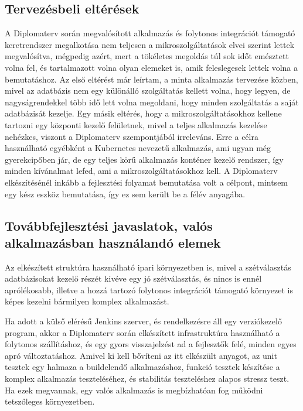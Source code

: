 \documentclass[11pt,magyar,a4paper,twoside,]{report}
\begin{document}
\subsection{Tervezésbeli
eltérések}\label{tervezuxe9sbeli-eltuxe9ruxe9sek}

A Diplomaterv során megvalósított alkalmazás és folytonos integrációt
támogató keretrendszer megalkotása nem teljesen a mikroszolgáltatások
elvei szerint lettek megvalósítva, mégpedig azért, mert a tökéletes
megoldás túl sok időt emésztett volna fel, és tartalmazott volna olyan
elemeket is, amik feleslegesek lettek volna a bemutatáshoz. Az első
eltérést már leírtam, a minta alkalmazás tervezése közben, mivel az
adatbázis nem egy különálló szolgáltatás kellett volna, hogy legyen, de
nagyságrendekkel több idő lett volna megoldani, hogy minden szolgáltatás
a saját adatbázisát kezelje. Egy másik eltérés, hogy a
mikroszolgáltatásokhoz kellene tartozni egy központi kezelő felületnek,
mivel a teljes alkalmazás kezelése nehézkes, viszont a Diplomaterv
szempontjából irreleváns. Erre a célra használható egyébként a
Kubernetes nevezetű alkalmazás, ami ugyan még gyerekcipőben jár, de egy
teljes körű alkalmazás konténer kezelő rendszer, így minden kívánalmat
lefed, ami a mikroszolgáltatásokhoz kell. A Diplomaterv elkészítésénél
inkább a fejlesztési folyamat bemutatása volt a célpont, mintsem egy
kész eszköz bemutatása, így ez sem került be a félév anyagába.

\subsection{Továbbfejlesztési javaslatok, valós alkalmazásban
használandó
elemek}\label{tovuxe1bbfejlesztuxe9si-javaslatok-valuxf3s-alkalmazuxe1sban-hasznuxe1landuxf3-elemek}

Az elkészített struktúra használható ipari környezetben is, mivel a
szétválasztás adatbázisokat kezelő részét kivéve egy jó szétválasztás,
és nincs is ennél aprólékosabb, illetve a hozzá tartozó folytonos
integrációt támogató környezet is képes kezelni bármilyen komplex
alkalmazást.

Ha adott a külső elérésű Jenkins szerver, és rendelkezésre áll egy
verziókezelő program, akkor a Diplomaterv során elkészített
infrastruktúra használható a folytonos szállításhoz, és egy gyors
visszajelzést ad a fejlesztők felé, minden egyes apró változtatáshoz.
Amivel ki kell bővíteni az itt elkészült anyagot, az unit tesztek egy
halmaza a buildelendő alkalmazáshoz, funkció tesztek készítése a komplex
alkalmazás teszteléséhez, és stabilitás teszteléshez alapos stressz
teszt. Ha ezek megvannak, egy valós alkalmazás is megbízhatóan fog
működni tetszőleges környezetben.
\end{document}
